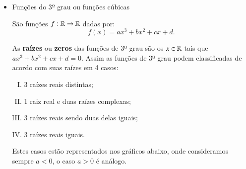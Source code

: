 \begin{itemize}
 \newpage
 \item Funções do 3º grau ou funções cúbicas

 São funções $f: \mathbb{R} \rightarrow \mathbb{R}$ dadas por:
 \[f(x)= ax^3 + bx^2 + cx + d .\]
 
 As \textbf{raízes} ou \textbf{zeros} das funções de 3º grau são os $x \in \mathbb{R}$ tais que $ax^3 + bx^2 + cx + d=0$. Assim as funções de 3º grau podem classificadas de acordo com suas raízes em 4 casos:
 \begin{enumerate}[(I)]
  \item 3 raízes reais distintas;
  \item 1 raiz real e duas raízes complexas;
  \item 3 raízes reais sendo duas delas iguais;
  \item 3 raízes reais iguais.
 \end{enumerate}
 Estes casos estão representados nos gráficos abaixo, onde consideramos sempre $a< 0$, o caso $a> 0$ é análogo.


   \begin{figure}[H]
   \end{figure}
   

\end{itemize}
